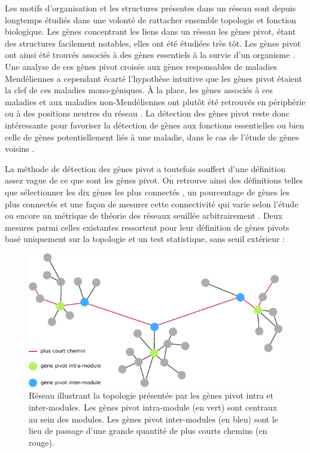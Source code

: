 Les motifs d'organisation et les structures présentes dans un réseau sont depuis longtemps étudiés dans une volonté de rattacher ensemble topologie et fonction biologique. Les gènes concentrant les liens dans un réseau les gènes pivot, étant des structures facilement notables, elles ont été étudiées très tôt. Les gènes pivot ont ainsi été trouvés associés à des gènes essentiels à la survie d'un \gls{organisme} \cite{Jeong2001May}. Une analyse de ces gènes pivot croisée aux gènes responsables de maladies Mendéliennes a cependant écarté l'hypothèse intuitive que les gènes pivot étaient la clef de ces maladies mono-géniques\cite{Goh2007May}. À la place, les gènes associés à ces maladies et aux maladies non-Mendéliennes ont plutôt été retrouvés en périphérie ou à des positions neutres du réseau \cite{Jeong2001May}. La détection des gènes pivot reste donc intéressante pour favoriser la détection de gènes aux fonctions essentielles ou bien celle de gènes potentiellement liés à une maladie, dans le cas de l'étude de gènes \glspl{voisin} \cite{Langfelder2013}.

La méthode de détection des gènes pivot a toutefois souffert d'une définition assez vague de ce que sont les gènes pivot. On retrouve ainsi des définitions telles que sélectionner les dix gènes les plus connectés \cite{Russo2018}, un pourcentage de gènes les plus connectés et une façon de mesurer cette connectivité qui varie selon l'étude \cite{Sundarrajan2016, Tang2018} ou encore un métrique de théorie des réseaux seuillée arbitrairement \cite{Saha2017}. Deux mesures parmi celles existantes ressortent pour leur définition de gènes pivots basé uniquement sur la topologie et un test statistique, sans seuil extérieur :

\begin{figure}[hb]
    \centering
    \includegraphics{img/intro/3_coexpr/intro_3_coexpr_hub_gene.pdf}
    \caption[Réseau illustrant la topologie présentée par les gènes pivot intra et inter-modules]{Réseau illustrant la topologie présentée par les gènes pivot intra et inter-modules. Les gènes pivot intra-module (en vert) sont centraux au sein des modules. Les gènes pivot inter-modules (en bleu) sont le lieu de passage d'une grande quantité de plus courts chemins (en rouge).}
    \label{fig:hub_gene_intra_inter}
\end{figure}


